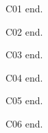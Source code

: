 C01 \parencite{a1} end.

C02 \cite{b1} end.

C03 \textcite{d1} end.

C04 \parencite{a1,b1} end.

C05 \parencite[5]{a1} end.

C06 \parencite[see][5]{b1} end.


